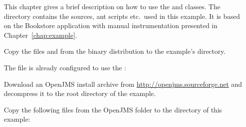 This chapter gives a brief description on how to use the  and  %
classes. The directory \dir{\JMSBookstoreApplicationDirDistro/} contains the %
sources, ant scripts etc.\ used in this example. It is based on the Bookstore %
application with manual instrumentation presented in Chapter~\ref{chap:example}. %


\begin{compactenum}
\item Copy the files \file{\mainJar} and \file{\commonsLoggingJar} from the %
binary distribution to the example's  directory.
\item The file  %
is already configured to use the :
\end{compactenum}

\setPropertiesListing


\begin{compactenum}\setcounter{enumi}{2}
\item Download an OpenJMS install archive from \url{http://openjms.sourceforge.net} %
and decompress it to the root directory of the example. 
\item Copy the following files from the OpenJMS  folder to the  directory 
   of this example:
\begin{compactenum}
\item {}
\item {}
\item {}
\item {}
\item {}
\item {}
\end{compactenum}
\end{compactenum}

\enlargethispage{2cm}

\

